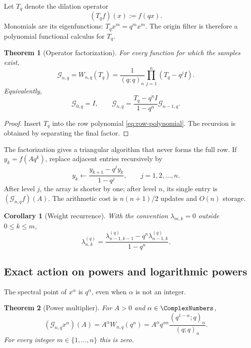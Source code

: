\documentclass[11pt,oneside]{article}
\numberwithin{equation}{section}
\newtheorem{theorem}{Theorem}[section]
\newtheorem{corollary}[corollary]{Corollary}
\theoremstyle{definition}
\theoremstyle{remark}
\newcommand{\Gc}{\mathcal G}
\begin{document}
Let $T_q$ denote the dilation operator
\[
 (T_qf)(x):=f(qx).
\]
Monomials are its eigenfunctions: $T_qx^m=q^mx^m$.  The origin filter is
therefore a polynomial functional calculus for $T_q$.

\begin{theorem}[Operator factorization]
For every function for which the samples exist,
\begin{equation}
 \Gc_{n,q}=W_{n,q}(T_q)
 =\frac1{(q;q)_n}\prod_{j=1}^n(T_q-q^jI).
 \label{eq:operator-factorization}
\end{equation}
Equivalently,
\begin{equation}
 \Gc_{0,q}=I,\qquad
 \Gc_{n,q}=\frac{T_q-q^nI}{1-q^n}\Gc_{n-1,q}.
 \label{eq:operator-recursion}
\end{equation}
\end{theorem}

\begin{proof}
Insert $T_q$ into the row polynomial \eqref{eq:row-polynomial}.  The recursion
is obtained by separating the final factor.
\end{proof}

The factorization gives a triangular algorithm that never forms the full row.
If $y_k=f(Aq^k)$, replace adjacent entries recursively by
\begin{equation}
 y_k\longleftarrow\frac{y_{k+1}-q^jy_k}{1-q^j},
 \qquad j=1,2,\ldots,n.
 \label{eq:triangular-filter}
\end{equation}
After level $j$, the array is shorter by one; after level $n$, its single
entry is $(\Gc_{n,q}f)(A)$.  The arithmetic cost is $n(n+1)/2$ updates and
$O(n)$ storage.

\begin{corollary}[Weight recurrence]
With the convention $\lambda_{m,k}=0$ outside $0\le k\le m$,
\begin{equation}
 \lambda_{n,k}^{(q)}
 =\frac{\lambda_{n-1,k-1}^{(q)}-q^n\lambda_{n-1,k}^{(q)}}{1-q^n}.
 \label{eq:weight-recursion}
\end{equation}
\end{corollary}

\subsection{Exact action on powers and logarithmic powers}

The spectral point of $x^\alpha$ is $q^\alpha$, even when $\alpha$ is not an
integer.

\begin{theorem}[Power multiplier]
For $A>0$ and $\alpha\in\ComplexNumbers$,
\begin{equation}
 (\Gc_{n,q}x^\alpha)(A)
 =A^\alpha W_{n,q}(q^\alpha)
 =A^\alpha q^{\alpha n}
   \frac{(q^{1-\alpha};q)_n}{(q;q)_n}.
 \label{eq:pure-power}
\end{equation}
For every integer $m\in\{1,\ldots,n\}$ this is zero.
\end{theorem}
\end{document}
